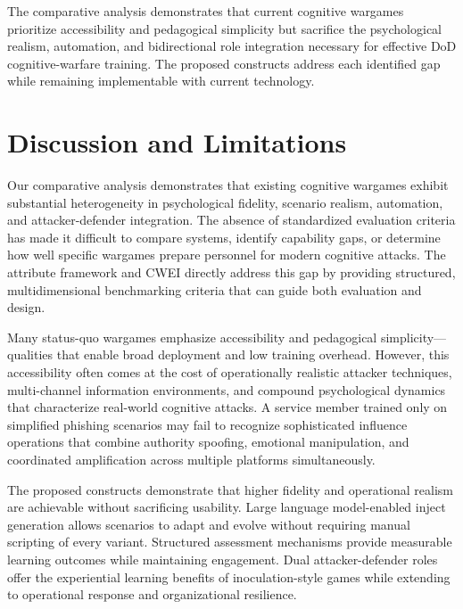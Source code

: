 \documentclass[12pt]{article}
\begin{document}
The comparative analysis demonstrates that current cognitive wargames prioritize accessibility and pedagogical simplicity but sacrifice the psychological realism, automation, and bidirectional role integration necessary for effective DoD cognitive-warfare training. The proposed constructs address each identified gap while remaining implementable with current technology.

\section{Discussion and Limitations}

Our comparative analysis demonstrates that existing cognitive wargames exhibit substantial heterogeneity in psychological fidelity, scenario realism, automation, and attacker-defender integration. The absence of standardized evaluation criteria has made it difficult to compare systems, identify capability gaps, or determine how well specific wargames prepare personnel for modern cognitive attacks. The attribute framework and CWEI directly address this gap by providing structured, multidimensional benchmarking criteria that can guide both evaluation and design.

Many status-quo wargames emphasize accessibility and pedagogical simplicity---qualities that enable broad deployment and low training overhead. However, this accessibility often comes at the cost of operationally realistic attacker techniques, multi-channel information environments, and compound psychological dynamics that characterize real-world cognitive attacks. A service member trained only on simplified phishing scenarios may fail to recognize sophisticated influence operations that combine authority spoofing, emotional manipulation, and coordinated amplification across multiple platforms simultaneously.

The proposed constructs demonstrate that higher fidelity and operational realism are achievable without sacrificing usability. Large language model-enabled inject generation allows scenarios to adapt and evolve without requiring manual scripting of every variant. Structured assessment mechanisms provide measurable learning outcomes while maintaining engagement. Dual attacker-defender roles offer the experiential learning benefits of inoculation-style games while extending to operational response and organizational resilience.
\end{document}
